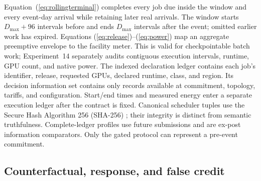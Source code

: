 \documentclass[10pt,journal]{IEEEtran}
\begin{document}
Equation~(\ref{eq:rollingterminal}) completes every job due inside the window and every event-day arrival
while retaining later real arrivals. The window starts $D_{\max}+96$ intervals
before and ends $D_{\max}$ intervals after the event; omitted earlier work has
expired. Equations (\ref{eq:release})--(\ref{eq:power}) map an aggregate preemptive
envelope to the facility meter. This is valid for checkpointable batch work;
Experiment~14 separately audits contiguous execution intervals, runtime, GPU
count, and native power.
The indexed declaration ledger contains each job's identifier, release,
requested GPUs, declared runtime, class, and region. Its decision information
set contains only records available at commitment, topology, tariffs, and
configuration. Start/end times and measured energy enter a separate execution
ledger after the contract is fixed. Canonical scheduler tuples use the
Secure Hash Algorithm 256 (SHA-256) \cite{nist2015fips1804}; their integrity is distinct from semantic
truthfulness. Complete-ledger profiles use future submissions and are ex-post
information comparators. Only the gated protocol can represent a pre-event
commitment.

\subsection{Counterfactual, response, and false credit}
\end{document}
